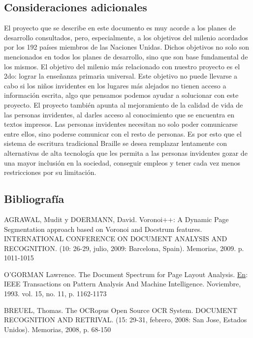 \documentclass[a4paper, 12pt, oneside]{article}
\begin{document}
	\clearpage

	\begin{center}
	\section{Consideraciones adicionales}
	\end{center}

	El proyecto que se describe en este documento es muy acorde a los planes de desarrollo consultados, pero, especialmente, a los objetivos del milenio acordados por los 192 países miembros de las Naciones Unidas. Dichos objetivos no solo son mencionados en todos los planes de desarrollo, sino que son base fundamental de los mismos. El objetivo del milenio más relacionado con nuestro proyecto es el 2do: lograr la enseñanza primaria universal. Este objetivo no puede llevarse a cabo si los niños invidentes en los lugares más alejados no tienen acceso a información escrita, algo que pensamos podemos ayudar a solucionar con este proyecto.
	El proyecto también apunta al mejoramiento de la calidad de vida de las personas invidentes, al darles
	acceso al conocimiento que se encuentra en textos impresos. Las personas invidentes necesitan no solo
	poder comunicarse entre ellos, sino poderse comunicar con el resto de personas. Es por esto que el sistema
	de escritura tradicional Braille se desea remplazar lentamente con alternativas de alta tecnología
	que les permita a las personas invidentes gozar de una mayor inclusión en la sociedad, conseguir empleos
	y tener cada vez menos restricciones por su limitación.
	
	\clearpage
	\begin{center}
	\section{Bibliografía}
	\end{center}
	AGRAWAL, Mudit y DOERMANN, David. Voronoi++: A Dynamic Page Segmentation approach based on Voronoi and Docstrum features. INTERNATIONAL CONFERENCE ON DOCUMENT ANALYSIS AND RECOGNITION. (10: 26-29, julio, 2009: Barcelona, Spain). Memorias, 2009. p. 1011-1015
	
	O'GORMAN Lawrence. The Document Spectrum for Page Layout Analysis. \underline{En}: IEEE Transactions on Pattern Analysis And Machine Intelligence. Noviembre, 1993. vol. 15, no. 11, p. 1162-1173
	
	BREUEL, Thomas. The OCRopus Open Source OCR System. DOCUMENT RECOGNITION AND RETRIVAL. (15: 29-31, febrero, 2008: San Jose, Estados Unidos). Memorias, 2008, p. 68-150
	
\end{document}
